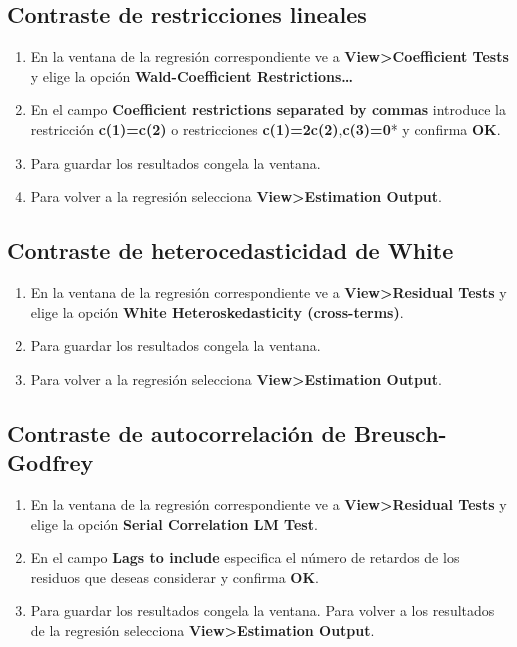 \documentclass[
]{book}
\providecommand{\tightlist}{%
  \setlength{\itemsep}{0pt}\setlength{\parskip}{0pt}}
\begin{document}
\hypertarget{contraste-de-restricciones-lineales}{%
\subsection{Contraste de restricciones lineales}\label{contraste-de-restricciones-lineales}}

\begin{enumerate}
\def\labelenumi{\arabic{enumi}.}
\tightlist
\item
  En la ventana de la regresión correspondiente ve a \textbf{View\textgreater Coefficient Tests} y elige la opción \textbf{Wald-Coefficient Restrictions\ldots{}}
\item
  En el campo \textbf{Coefficient restrictions separated by commas} introduce la restricción \textbf{c(1)=c(2)} o restricciones \textbf{c(1)=2c(2)},\textbf{c(3)=0}* y confirma \textbf{OK}.
\item
  Para guardar los resultados congela la ventana.
\item
  Para volver a la regresión selecciona \textbf{View\textgreater Estimation Output}.
\end{enumerate}

\hypertarget{contraste-de-heterocedasticidad-de-white}{%
\subsection{Contraste de heterocedasticidad de White}\label{contraste-de-heterocedasticidad-de-white}}

\begin{enumerate}
\def\labelenumi{\arabic{enumi}.}
\tightlist
\item
  En la ventana de la regresión correspondiente ve a \textbf{View\textgreater Residual Tests} y elige la opción \textbf{White Heteroskedasticity (cross-terms)}.
\item
  Para guardar los resultados congela la ventana.
\item
  Para volver a la regresión selecciona \textbf{View\textgreater Estimation Output}.
\end{enumerate}

\hypertarget{contraste-de-autocorrelaciuxf3n-de-breusch-godfrey}{%
\subsection{Contraste de autocorrelación de Breusch-Godfrey}\label{contraste-de-autocorrelaciuxf3n-de-breusch-godfrey}}

\begin{enumerate}
\def\labelenumi{\arabic{enumi}.}
\tightlist
\item
  En la ventana de la regresión correspondiente ve a \textbf{View\textgreater Residual Tests} y elige la opción \textbf{Serial Correlation LM Test}.
\item
  En el campo \textbf{Lags to include} especifica el número de retardos de los residuos que deseas considerar y confirma \textbf{OK}.
\item
  Para guardar los resultados congela la ventana. Para volver a los resultados de la regresión selecciona \textbf{View\textgreater Estimation Output}.
\end{enumerate}
\end{document}
